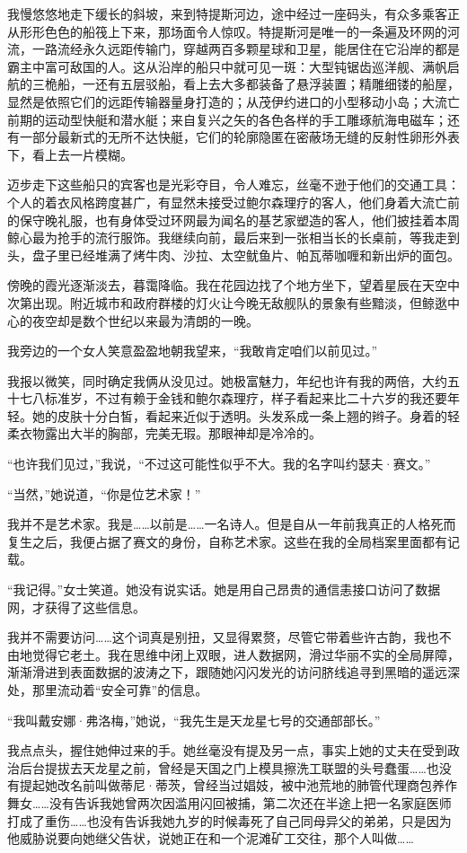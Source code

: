 \documentclass[AutoFakeBold=true]{book}
\begin{document}
我慢悠悠地走下缓长的斜坡，来到特提斯河边，途中经过一座码头，有众多乘客正从形形色色的船筏上下来，那场面令人惊叹。特提斯河是唯一的一条遍及环网的河流，一路流经永久远距传输门，穿越两百多颗星球和卫星，能居住在它沿岸的都是霸主中富可敌国的人。这从沿岸的船只中就可见一斑：大型钝锯齿巡洋舰、满帆启航的三桅船，一还有五层驳船，看上去大多都装备了悬浮装置；精雕细镂的船屋，显然是依照它们的远距传输器量身打造的；从茂伊约进口的小型移动小岛；大流亡前期的运动型快艇和潜水艇；来自复兴之矢的各色各样的手工雕琢航海电磁车；还有一部分最新式的无所不达快艇，它们的轮廓隐匿在密蔽场无缝的反射性卵形外表下，看上去一片模糊。

迈步走下这些船只的宾客也是光彩夺目，令人难忘，丝毫不逊于他们的交通工具：个人的着衣风格跨度甚广，有显然未接受过鲍尔森理疗的客人，他们身着大流亡前的保守晚礼服，也有身体受过环网最为闻名的基艺家塑造的客人，他们披挂着本周鲸心最为抢手的流行服饰。我继续向前，最后来到一张相当长的长桌前，等我走到头，盘子里已经堆满了烤牛肉、沙拉、太空鱿鱼片、帕瓦蒂咖喱和新出炉的面包。

傍晚的霞光逐渐淡去，暮霭降临。我在花园边找了个地方坐下，望着星辰在天空中次第出现。附近城市和政府群楼的灯火让今晚无敌舰队的景象有些黯淡，但鲸逖中心的夜空却是数个世纪以来最为清朗的一晚。

我旁边的一个女人笑意盈盈地朝我望来，``我敢肯定咱们以前见过。''

我报以微笑，同时确定我俩从没见过。她极富魅力，年纪也许有我的两倍，大约五十七八标准岁，不过有赖于金钱和鲍尔森理疗，样子看起来比二十六岁的我还要年轻。她的皮肤十分白皙，看起来近似于透明。头发系成一条上翘的辫子。身着的轻柔衣物露出大半的胸部，完美无瑕。那眼神却是冷冷的。

``也许我们见过，''我说，``不过这可能性似乎不大。我的名字叫约瑟夫·赛文。''

``当然，''她说道，``你是位艺术家！''

我并不是艺术家。我是……以前是……一名诗人。但是自从一年前我真正的人格死而复生之后，我便占据了赛文的身份，自称艺术家。这些在我的全局档案里面都有记载。

``我记得。''女士笑道。她没有说实话。她是用自己昂贵的通信恚接口访问了数据网，才获得了这些信息。

我并不需要访问……这个词真是别扭，又显得累赘，尽管它带着些许古韵，我也不由地觉得它老土。我在思维中闭上双眼，进人数据网，滑过华丽不实的全局屏障，渐渐滑进到表面数据的波涛之下，跟随她闪闪发光的访问脐线追寻到黑暗的遥远深处，那里流动着``安全可靠''的信息。

``我叫戴安娜·弗洛梅，''她说，``我先生是天龙星七号的交通部部长。''

我点点头，握住她伸过来的手。她丝毫没有提及另一点，事实上她的丈夫在受到政治后台提拔去天龙星之前，曾经是天国之门上模具擦洗工联盟的头号蠢蛋……也没有提起她改名前叫做蒂尼·蒂茨，曾经当过娼妓，被中池荒地的肺管代理商包养作舞女……没有告诉我她曾两次因滥用闪回被捕，第二次还在半途上把一名家庭医师打成了重伤……也没有告诉我她九岁的时候毒死了自己同母异父的弟弟，只是因为他威胁说要向她继父告状，说她正在和一个泥滩矿工交往，那个人叫做……
\end{document}
